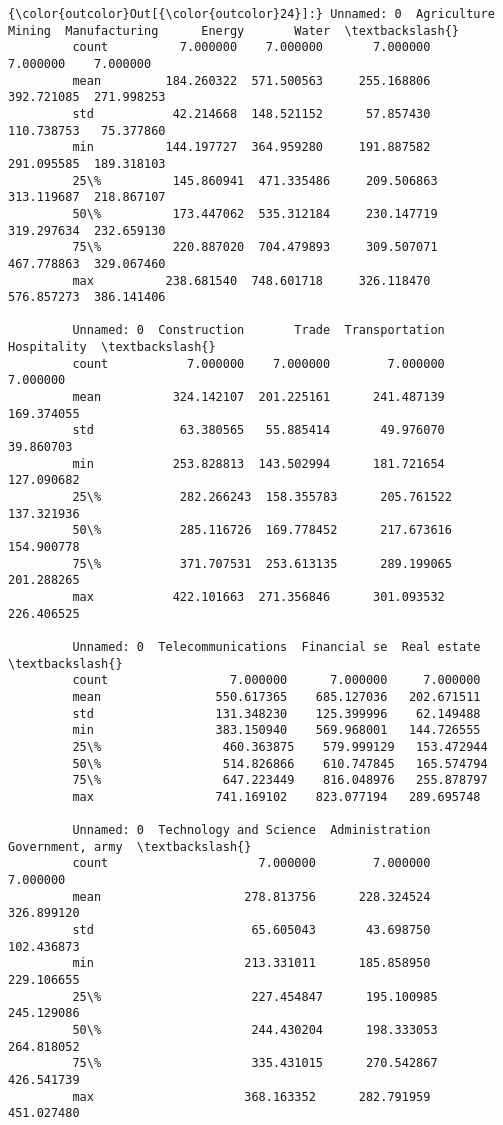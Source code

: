 \documentclass[11pt]{article}
\begin{document}
\begin{Verbatim}[commandchars=\\\{\}]
{\color{outcolor}Out[{\color{outcolor}24}]:} Unnamed: 0  Agriculture      Mining  Manufacturing      Energy       Water  \textbackslash{}
         count          7.000000    7.000000       7.000000    7.000000    7.000000   
         mean         184.260322  571.500563     255.168806  392.721085  271.998253   
         std           42.214668  148.521152      57.857430  110.738753   75.377860   
         min          144.197727  364.959280     191.887582  291.095585  189.318103   
         25\%          145.860941  471.335486     209.506863  313.119687  218.867107   
         50\%          173.447062  535.312184     230.147719  319.297634  232.659130   
         75\%          220.887020  704.479893     309.507071  467.778863  329.067460   
         max          238.681540  748.601718     326.118470  576.857273  386.141406   
         
         Unnamed: 0  Construction       Trade  Transportation  Hospitality  \textbackslash{}
         count           7.000000    7.000000        7.000000     7.000000   
         mean          324.142107  201.225161      241.487139   169.374055   
         std            63.380565   55.885414       49.976070    39.860703   
         min           253.828813  143.502994      181.721654   127.090682   
         25\%           282.266243  158.355783      205.761522   137.321936   
         50\%           285.116726  169.778452      217.673616   154.900778   
         75\%           371.707531  253.613135      289.199065   201.288265   
         max           422.101663  271.356846      301.093532   226.406525   
         
         Unnamed: 0  Telecommunications  Financial se  Real estate  \textbackslash{}
         count                 7.000000      7.000000     7.000000   
         mean                550.617365    685.127036   202.671511   
         std                 131.348230    125.399996    62.149488   
         min                 383.150940    569.968001   144.726555   
         25\%                 460.363875    579.999129   153.472944   
         50\%                 514.826866    610.747845   165.574794   
         75\%                 647.223449    816.048976   255.878797   
         max                 741.169102    823.077194   289.695748   
         
         Unnamed: 0  Technology and Science  Administration  Government, army  \textbackslash{}
         count                     7.000000        7.000000          7.000000   
         mean                    278.813756      228.324524        326.899120   
         std                      65.605043       43.698750        102.436873   
         min                     213.331011      185.858950        229.106655   
         25\%                     227.454847      195.100985        245.129086   
         50\%                     244.430204      198.333053        264.818052   
         75\%                     335.431015      270.542867        426.541739   
         max                     368.163352      282.791959        451.027480   
         

\end{Verbatim}
\end{document}
